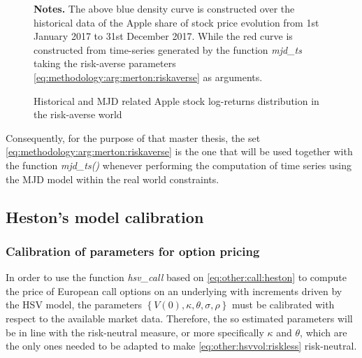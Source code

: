 \documentclass[12pt,a4paper]{report}
\begin{document}
\begin{figure}[h]
  \centering
  
  \caption{Historical and MJD related Apple stock log-returns distribution in the risk-averse world}
  \begin{changemargin}{0.5cm}{0.5cm}
  \medskip
\footnotesize
{}\textbf{Notes.} The above blue density curve is constructed over the historical data of the Apple share of stock price evolution from 1st January 2017 to 31st December 2017. While the red curve is constructed from time-series generated by the function \textit{mjd\_ts} taking the risk-averse parameters \ref{eq:methodology:arg:merton:riskaverse} as arguments.  
\end{changemargin}
  \label{p:methodology:density:aapl:merton:riskaverse}
\end{figure}

Consequently, for the purpose of that master thesis, the set \ref{eq:methodology:arg:merton:riskaverse} is the one that will be used together with the function \textit{mjd\_ts()} whenever performing the computation of time series using the MJD model within the real world constraints.











%
%
%
%
%
%


\subsection{Heston's model calibration}
\label{sub:methodology:calibration:heston}

\subsubsection*{Calibration of parameters for option pricing}

In order to use the function \textit{hsv\_call} based on \cref{eq:other:call:heston} to compute the price of European call options on an underlying with increments driven by the HSV model, the parameters $\left\{ V(0), \kappa, \theta, \sigma, \rho \right\}$ must be calibrated with respect to the available market data.
Therefore, the so estimated parameters will be in line with the risk-neutral measure, or more specifically $\kappa$ and $\theta$, which are the only ones needed to be adapted to make \cref{eq:other:hsvvol:riskless} risk-neutral.
\end{document}

